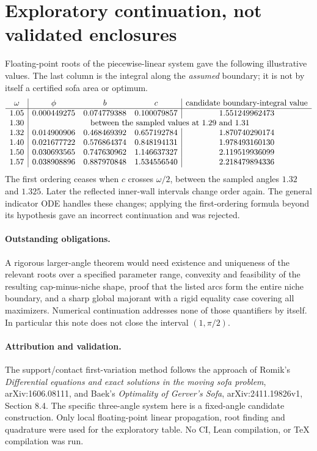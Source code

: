 \documentclass[11pt]{article}
\begin{document}
\section*{Exploratory continuation, not validated enclosures}
Floating-point roots of the piecewise-linear system gave the following illustrative values. The last column is the integral along the \emph{assumed} boundary; it is not by itself a certified sofa area or optimum.
\[
\begin{array}{c|ccc|c}
\omega&\phi&b&c&\text{candidate boundary-integral value}\\\hline
1.05&0.000449275&0.074779388&0.100079857&1.551249962473\\
1.30&\multicolumn{4}{c}{\text{between the sampled values at }1.29\text{ and }1.31}\\
1.32&0.014900906&0.468469392&0.657192784&1.870740290174\\
1.40&0.021677722&0.576864374&0.848194131&1.978493160130\\
1.50&0.030693565&0.747630962&1.146637327&2.119519936099\\
1.57&0.038908896&0.887970848&1.534556540&2.218479894336
\end{array}
\]
The first ordering ceases when $c$ crosses $\omega/2$, between the sampled angles $1.32$ and $1.325$. Later the reflected inner-wall intervals change order again. The general indicator ODE handles these changes; applying the first-ordering formula beyond its hypothesis gave an incorrect continuation and was rejected.

\paragraph{Outstanding obligations.}
A rigorous larger-angle theorem would need existence and uniqueness of the relevant roots over a specified parameter range, convexity and feasibility of the resulting cap-minus-niche shape, proof that the listed arcs form the entire niche boundary, and a sharp global majorant with a rigid equality case covering all maximizers. Numerical continuation addresses none of those quantifiers by itself. In particular this note does not close the interval $(1,\pi/2)$.

\paragraph{Attribution and validation.}
The support/contact first-variation method follows the approach of Romik's \emph{Differential equations and exact solutions in the moving sofa problem}, arXiv:1606.08111, and Baek's \emph{Optimality of Gerver's Sofa}, arXiv:2411.19826v1, Section 8.4. The specific three-angle system here is a fixed-angle candidate construction. Only local floating-point linear propagation, root finding and quadrature were used for the exploratory table. No CI, Lean compilation, or TeX compilation was run.
\end{document}
